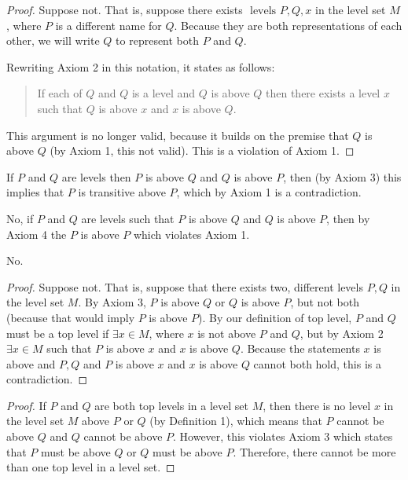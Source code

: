 \documentclass[12pt]{article}
\begin{document}
\begin{proof}
    Suppose not. That is, suppose there exists $\text{ levels } P, Q, x$ in the level set $M$, where $P$ is a different name for $Q$. Because they are both representations of each other, we will write $Q$ to represent both $P$ and $Q$.

    Rewriting Axiom 2 in this notation, it states as follows:

    \begin{quote}
        If each of $Q$ and $Q$ is a level and $Q$ is above $Q$ then there exists a level $x$ such that $Q$ is above $x$ and $x$ is above $Q$.
    \end{quote}

    This argument is no longer valid, because it builds on the premise that $Q$ is above $Q$ (by Axiom 1, this not valid). This is a violation of Axiom 1.
\end{proof}

\problem
If $P$ and $Q$ are levels then $P$ is above $Q$ and $Q$ is above $P$, then (by Axiom 3) this implies that $P$ is transitive above $P$, which by Axiom 1 is a contradiction.

No, if $P$ and $Q$ are levels such that $P$ is above $Q$ and $Q$ is above $P$, then by Axiom 4 the $P$ is above $P$ which violates Axiom 1.


\problem
No.

\begin{proof}
    Suppose not. That is, suppose that there exists two, different levels $P, Q$ in the level set $M$. By Axiom 3, $P$ is above $Q$ or $Q$ is above $P$, but not both (because that would imply $P$ is above $P$). By our definition of top level, $P$ and $Q$ must be a top level if $\exists x \in M$, where $x$ is not above $P$ and $Q$, but by Axiom 2 $\exists x \in M$ such that $P$ is above $x$ and $x$ is above $Q$. Because the statements $x$ is above and $P, Q$ and $P$ is above $x$ and $x$ is above $Q$ cannot both hold, this is a contradiction.
\end{proof}

\begin{proof}
    If $P$ and $Q$ are both top levels in a level set $M$, then there is no level $x$ in the level set $M$ above $P$ or $Q$ (by Definition 1), which means that $P$ cannot be above $Q$ and $Q$ cannot be above $P$. However, this violates Axiom 3 which states that $P$ must be above $Q$ or $Q$ must be above $P$. Therefore, there cannot be more than one top level in a level set.
\end{proof}
\end{document}
